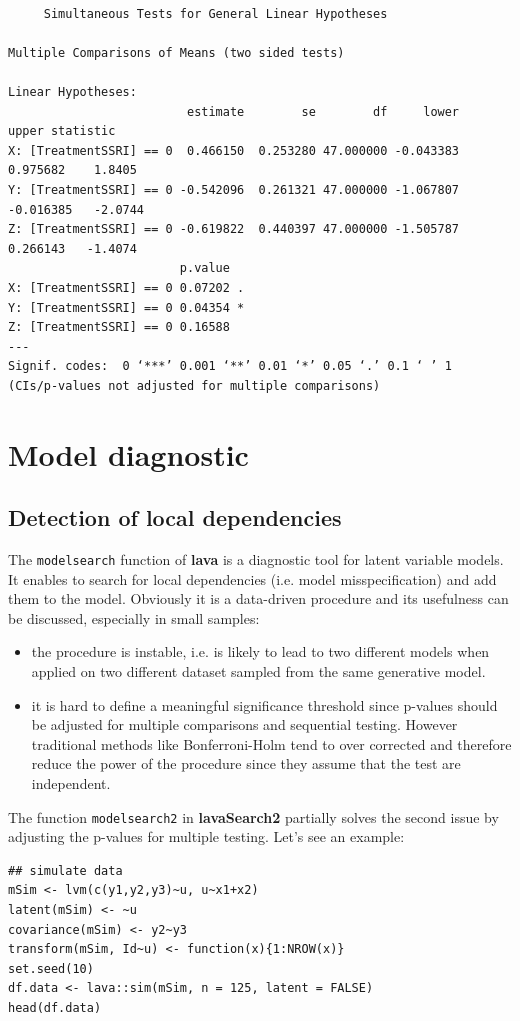 \documentclass[12pt]{article}
\begin{document}
\begin{verbatim}

	 Simultaneous Tests for General Linear Hypotheses

Multiple Comparisons of Means (two sided tests) 

Linear Hypotheses:
                         estimate        se        df     lower     upper statistic
X: [TreatmentSSRI] == 0  0.466150  0.253280 47.000000 -0.043383  0.975682    1.8405
Y: [TreatmentSSRI] == 0 -0.542096  0.261321 47.000000 -1.067807 -0.016385   -2.0744
Z: [TreatmentSSRI] == 0 -0.619822  0.440397 47.000000 -1.505787  0.266143   -1.4074
                        p.value  
X: [TreatmentSSRI] == 0 0.07202 .
Y: [TreatmentSSRI] == 0 0.04354 *
Z: [TreatmentSSRI] == 0 0.16588  
---
Signif. codes:  0 ‘***’ 0.001 ‘**’ 0.01 ‘*’ 0.05 ‘.’ 0.1 ‘ ’ 1
(CIs/p-values not adjusted for multiple comparisons)
\end{verbatim}

\clearpage 

\section{Model diagnostic}
\label{sec:orgc1e79df}
\subsection{Detection of local dependencies}
\label{sec:org439924f}

The \texttt{modelsearch} function of \textbf{lava} is a diagnostic tool for latent
variable models. It enables to search for local dependencies
(i.e. model misspecification) and add them to the model. Obviously it
is a data-driven procedure and its usefulness can be discussed,
especially in small samples:
\begin{itemize}
\item the procedure is instable, i.e. is likely to lead to two different
models when applied on two different dataset sampled from the same
generative model.
\item it is hard to define a meaningful significance threshold since
p-values should be adjusted for multiple comparisons and sequential
testing. However traditional methods like Bonferroni-Holm tend to
over corrected and therefore reduce the power of the procedure since
they assume that the test are independent.
\end{itemize}

The function \texttt{modelsearch2} in \textbf{lavaSearch2} partially solves the
second issue by adjusting the p-values for multiple testing. Let's see
an example:
\lstset{language=r,label= ,caption= ,captionpos=b,numbers=none}
\begin{lstlisting}
## simulate data
mSim <- lvm(c(y1,y2,y3)~u, u~x1+x2)
latent(mSim) <- ~u
covariance(mSim) <- y2~y3
transform(mSim, Id~u) <- function(x){1:NROW(x)}
set.seed(10)
df.data <- lava::sim(mSim, n = 125, latent = FALSE)
head(df.data)
\end{lstlisting}
\end{document}
